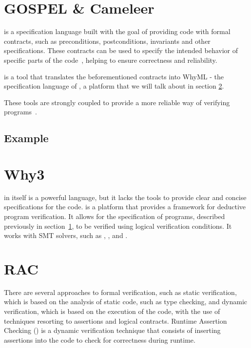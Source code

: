 \section{GOSPEL \& Cameleer}
\label{sec:gospel_and_cameleer}

\gospellang is a specification language built with the goal of providing \ocaml code 
with formal contracts, such as preconditions, postconditions, invariants and other 
specifications. These contracts can be used to specify the intended behavior of 
specific parts of the code~\cite{Soares_Chirica_Pereira2024}, helping to ensure correctness and reliability.

\cameleer is a tool that translates the beforementioned contracts into WhyML - 
the specification language of \why, a platform that we will talk about in 
section \ref{sec:why3}.

These tools are strongly coupled to provide a more reliable way of verifying 
\ocaml programs~\cite{Pereira2024}.

\subsection{Example}
\label{sub:example}


\section{Why3}
\label{sec:why3}

\ocaml in itself is a powerful language, but it lacks the tools to provide clear 
and concise specifications for the code. \why is a platform that provides a framework 
for deductive program verification. It allows for the specification of programs, 
described previously in section~\ref{sec:gospel_and_cameleer}, to be verified using 
logical verification conditions. It works with SMT solvers, such as \zthree, \altergo, 
and \coq.

\section{RAC}
\label{sec:rac}

There are several approaches to formal verification, such as static verification, 
which is based on the analysis of static code, such as type checking, and dynamic 
verification, which is based on the execution of the code, with the use of 
techniques resorting to assertions and logical contracts. Runtime Assertion Checking 
(\rac) is a dynamic verification technique that consists of inserting assertions 
into the code to check for correctness during runtime.

